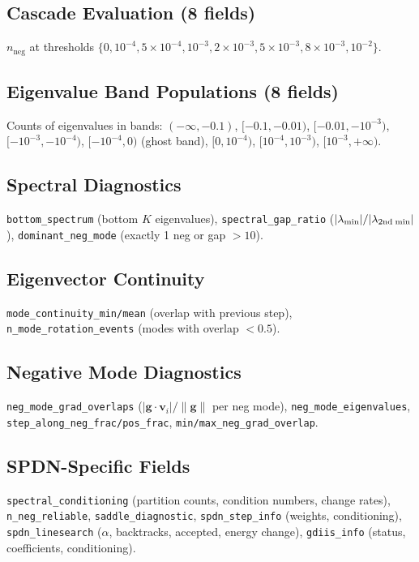 \documentclass[11pt,a4paper]{article}
\newcommand{\vect}[1]{\mathbf{#1}}
\newcommand{\evec}{\vect{v}}
\newcommand{\eval}{\lambda}
\begin{document}
\subsection{Cascade Evaluation (8 fields)}

$n_\text{neg}$ at thresholds $\{0, 10^{-4}, 5\times10^{-4}, 10^{-3}, 2\times10^{-3}, 5\times10^{-3}, 8\times10^{-3}, 10^{-2}\}$.

\subsection{Eigenvalue Band Populations (8 fields)}

Counts of eigenvalues in bands: $(-\infty, -0.1)$, $[-0.1, -0.01)$, $[-0.01, -10^{-3})$, $[-10^{-3}, -10^{-4})$, $[-10^{-4}, 0)$ (ghost band), $[0, 10^{-4})$, $[10^{-4}, 10^{-3})$, $[10^{-3}, +\infty)$.

\subsection{Spectral Diagnostics}

\texttt{bottom\_spectrum} (bottom $K$ eigenvalues), \texttt{spectral\_gap\_ratio} ($|\eval_\text{min}|/|\eval_\text{2nd\;min}|$), \texttt{dominant\_neg\_mode} (exactly 1 neg or gap $> 10$).

\subsection{Eigenvector Continuity}

\texttt{mode\_continuity\_min/mean} (overlap with previous step), \texttt{n\_mode\_rotation\_events} (modes with overlap $< 0.5$).

\subsection{Negative Mode Diagnostics}

\texttt{neg\_mode\_grad\_overlaps} ($|\vect{g}\cdot\evec_i|/\|\vect{g}\|$ per neg mode), \texttt{neg\_mode\_eigenvalues}, \texttt{step\_along\_neg\_frac/pos\_frac}, \texttt{min/max\_neg\_grad\_overlap}.

\subsection{SPDN-Specific Fields}

\texttt{spectral\_conditioning} (partition counts, condition numbers, change rates), \texttt{n\_neg\_reliable}, \texttt{saddle\_diagnostic}, \texttt{spdn\_step\_info} (weights, conditioning), \texttt{spdn\_linesearch} ($\alpha$, backtracks, accepted, energy change), \texttt{gdiis\_info} (status, coefficients, conditioning).
\end{document}

